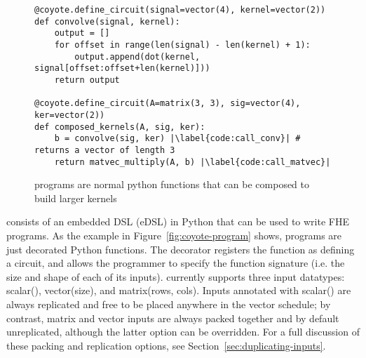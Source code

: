   
    

\begin{figure}
    \begin{verbatim}
@coyote.define_circuit(signal=vector(4), kernel=vector(2))
def convolve(signal, kernel):
    output = []
    for offset in range(len(signal) - len(kernel) + 1):
        output.append(dot(kernel, signal[offset:offset+len(kernel)]))
    return output
    
@coyote.define_circuit(A=matrix(3, 3), sig=vector(4), ker=vector(2))
def composed_kernels(A, sig, ker):
    b = convolve(sig, ker) |\label{code:call_conv}| # returns a vector of length 3
    return matvec_multiply(A, b) |\label{code:call_matvec}|
    \end{verbatim}
    \caption{\system programs are normal python functions that can be composed to build larger kernels}\label{fig:coyote-programs-compose}
\end{figure}

\system consists of an embedded DSL (eDSL) in Python that can be used to write FHE programs.
As the example in Figure~\ref{fig:coyote-program} shows, \system programs are just decorated Python functions.
The decorator registers the function as defining a \system circuit, and allows the programmer to specify the function signature (i.e. the size and shape of each of its inputs).
\system currently supports three input datatypes: {\sf scalar()}, {\sf vector(size)}, and {\sf matrix(rows, cols)}.
Inputs annotated with {\sf scalar()} are always replicated  and free to be placed anywhere in the vector schedule; by contrast, {\sf matrix} and {\sf vector} inputs are always packed together and by default unreplicated, although the latter option can be overridden.
For a full discussion of these packing and replication options, see Section~\ref{sec:duplicating-inputs}. 


